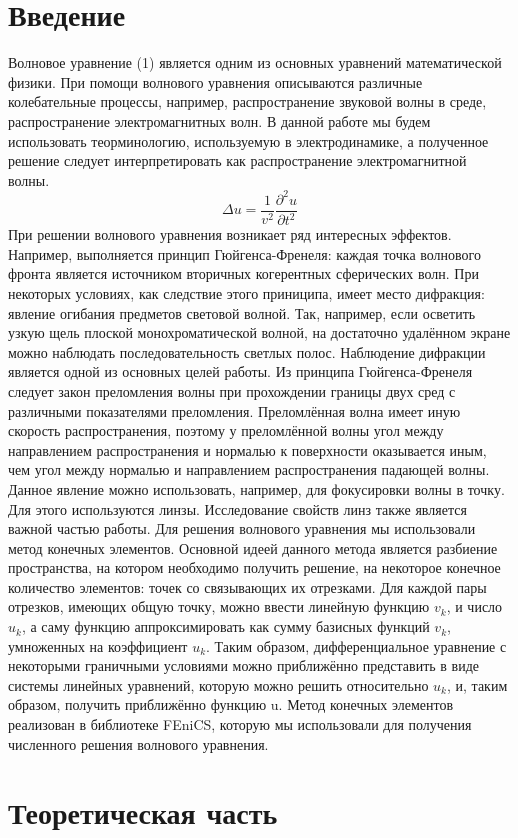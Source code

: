 \documentclass[
11pt,%
tightenlines,%
twoside,%
onecolumn,%
nofloats,%
nobibnotes,%
nofootinbib,%
superscriptaddress,%
noshowpacs,%
centertags]%
{revtex4}
\begin{document}
\section{Введение}
Волновое уравнение (1) является одним из основных уравнений математической физики. При помощи
волнового уравнения описываются различные колебательные процессы, например, 
распространение звуковой волны в среде, распространение электромагнитных волн. В данной работе
мы будем использовать теорминологию, используемую в электродинамике, а полученное решение 
следует интерпретировать как распространение электромагнитной волны. \newline
\begin{equation}
    \Delta u = \frac{1}{v^2}\frac{\partial^2u}{\partial t^2}
\end{equation}
При решении волнового уравнения возникает ряд интересных эффектов. Например, выполняется принцип
Гюйгенса-Френеля: каждая точка волнового фронта является источником вторичных
когерентных сферических волн. При некоторых условиях, как следствие этого приниципа, 
имеет место дифракция: явление огибания предметов световой волной. Так, например, если осветить
узкую щель плоской монохроматической волной, на достаточно удалённом экране можно наблюдать
последовательность светлых полос. Наблюдение дифракции является одной из основных целей
работы.\newline
Из принципа Гюйгенса-Френеля следует закон преломления волны при прохождении границы двух сред
с различными показателями преломления. Преломлённая волна имеет иную скорость распространения, поэтому
у преломлённой волны угол между направлением распространения и нормалью к поверхности оказывается
иным, чем угол между нормалью и направлением распространения падающей волны. Данное явление
можно использовать, например, для фокусировки волны в точку. Для этого используются
линзы. Исследование свойств линз также является важной частью работы. \newline
Для решения волнового уравнения мы использовали метод конечных элементов. Основной идеей данного
метода является разбиение пространства, на котором необходимо получить решение, на некоторое
конечное количество элементов: точек со связывающих их отрезками. Для каждой пары отрезков, имеющих
общую точку, можно ввести линейную функцию $v_k$, и число $u_k$, а саму функцию аппроксимировать как
сумму базисных функций $v_k$, умноженных на коэффициент $u_k$. Таким образом, дифференциальное уравнение
с некоторыми граничными условиями можно приближённо представить в виде системы линейных уравнений,
которую можно решить относительно $u_k$, и, таким образом, получить приближённо функцию u. Метод 
конечных элементов реализован в библиотеке FEniCS, которую мы использовали для получения численного
решения волнового уравнения.


\section{Теоретическая часть}
\end{document}
